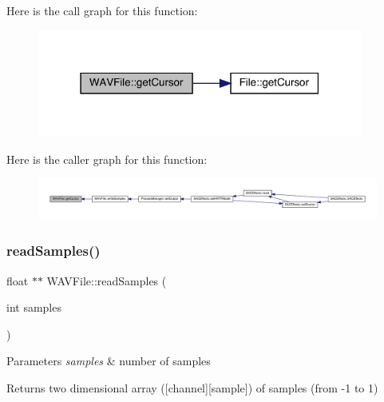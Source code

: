 Here is the call graph for this function\+:
\nopagebreak
\begin{figure}[H]
\begin{center}
\leavevmode
\includegraphics[width=303pt]{class_w_a_v_file_a09b0c9107c31966537eaef404abbe0c6_cgraph}
\end{center}
\end{figure}
Here is the caller graph for this function\+:
\nopagebreak
\begin{figure}[H]
\begin{center}
\leavevmode
\includegraphics[width=350pt]{class_w_a_v_file_a09b0c9107c31966537eaef404abbe0c6_icgraph}
\end{center}
\end{figure}
\mbox{\label{class_w_a_v_file_aa14a22c094f310cecc33cc573507378c}} 
\subsubsection{\texorpdfstring{read\+Samples()}{readSamples()}}
{\footnotesize\ttfamily float $\ast$$\ast$ W\+A\+V\+File\+::read\+Samples (\begin{DoxyParamCaption}\item[{int}]{samples }\end{DoxyParamCaption})}


\begin{DoxyParams}{Parameters}
{\em samples} & number of samples \\
\hline
\end{DoxyParams}
\begin{DoxyReturn}{Returns}
two dimensional array (\mbox{[}channel\mbox{]}\mbox{[}sample\mbox{]}) of samples (from -\/1 to 1) 
\end{DoxyReturn}


